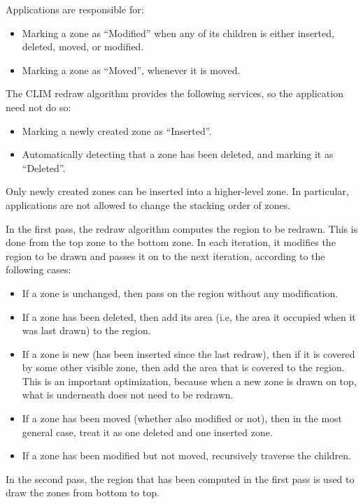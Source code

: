 \documentclass{report}
\begin{document}
Applications are responsible for:

\begin{itemize}
\item Marking a zone as ``Modified'' when any of its children is
  either inserted, deleted, moved, or modified.
\item Marking a zone as ``Moved'', whenever it is moved. 
\end{itemize}

The CLIM redraw algorithm provides the following services, so the
application need not do so:

\begin{itemize}
\item Marking a newly created zone as ``Inserted''. 
\item Automatically detecting that a zone has been deleted, and
  marking it as ``Deleted''. 
\end{itemize}

Only newly created zones can be inserted into a higher-level
zone.  In particular, applications are not allowed to change the
stacking order of zones. 

In the first pass, the redraw algorithm computes the region to be
redrawn.  This is done from the top zone to the bottom zone.  In
each iteration, it modifies the region to be drawn and passes it on to
the next iteration, according to the following cases:

\begin{itemize}
\item If a zone is unchanged, then pass on the region without any
  modification. 
\item If a zone has been deleted, then add its area (i.e, the area
  it occupied when it was last drawn) to the region.
\item If a zone is new (has been inserted since the last redraw),
  then if it is covered by some other visible zone, then add the
  area that is covered to the region.  This is an important
  optimization, because when a new zone is drawn on top, what is
  underneath does not need to be redrawn. 
\item If a zone has been moved (whether also modified or not), then
  in the most general case, treat it as one deleted and one inserted
  zone.
\item If a zone has been modified but not moved, recursively
  traverse the children.
\end{itemize}

In the second pass, the region that has been computed in the first
pass is used to draw the zones from bottom to top.
\end{document}
